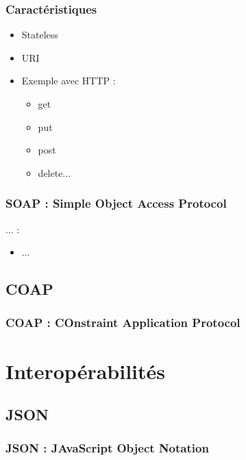 \documentclass{beamer}
\begin{document}
        \begin{frame}
            \frametitle{Caractéristiques}
            \begin{itemize}
            \item Stateless
            \item URI
            \item Exemple avec HTTP :
                \begin{itemize}
                \item get
                \item put
                \item post
                \item delete...
                \end{itemize}
            \end{itemize}
        \end{frame}

        \begin{frame}
            \frametitle{SOAP : Simple Object Access Protocol}
            ... :
            \begin{itemize}
                \item ...
            \end{itemize}
        \end{frame}

    \subsection{COAP}
        \begin{frame}
            \frametitle{COAP : COnstraint Application Protocol}
        \end{frame}

\section{Interopérabilités}

    \subsection{JSON}
        \begin{frame}
            \frametitle{JSON : JAvaScript Object Notation}
        \end{frame}
\end{document}

